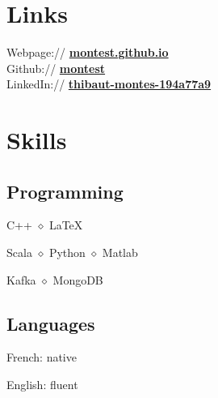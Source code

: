 \documentclass[]{deedy-resume-openfont}
\begin{document}
\begin{minipage}[t]{0.33\textwidth}

\vspace{\topsep}
\vspace{\topsep}
\section{Links} 
Webpage:// \href{https://montest.github.io}{\bf montest.github.io} \\
Github:// \href{https://github.com/montest}{\bf montest} \\
LinkedIn:// \href{https://www.linkedin.com/in/thibaut-montes-194a77a9}{\bf thibaut-montes-194a77a9}


\vspace{\topsep}
\vspace{\topsep}
\section{Skills}

\subsection{Programming}
\vspace{\topsep}
\begin{tightemize}
\item {}
C++ $\diamond$ \LaTeX \\
\item {}
Scala $\diamond$ Python $\diamond$ Matlab \\
\item {}
Kafka $\diamond$ MongoDB
\end{tightemize}

\sectionsep
\subsection{Languages}
\vspace{\topsep}
\begin{tightemize}
\item French: native
\item English: fluent
\end{tightemize}


\end{minipage}
\end{document}
